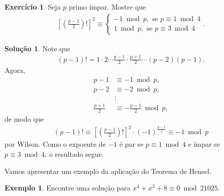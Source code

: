 \documentclass[a4paper,11pt,twoside, leqno]{article}
\theoremstyle{definition}
\newtheorem{exercise}{Exercício}
\newtheorem*{example}{Exemplo}
\newtheorem*{solution}{Solução}
\begin{document}
\begin{exercise}
	Seja $p$ primo ímpar. Mostre que
	\begin{align*}
	\left[ \left( \frac{p-1}{2} \right)! \right]^2\equiv\begin{cases}
	-1\bmod p, \text{ se } p\equiv 1\bmod 4 \\
	1\bmod p, \text{ se } p\equiv 3\bmod 4
	\end{cases}.
	\end{align*}
\end{exercise}
\begin{solution}
	Note que 
	\begin{align*}
	(p-1)! = 1\cdot 2\cdots \frac{p-1}{2}\cdot\frac{p+1}{2}\cdots (p-2)(p-1).
	\end{align*}
	Agora,
	\begin{align*}
	p-1&\equiv -1\bmod p, \\
	p-2&\equiv -2\bmod p, \\
	&\vdots \\
	\frac{p+1}{2}&\equiv -\frac{p-1}{2}\bmod p,
	\end{align*}
	de modo que 
	\begin{align*}
	(p-1)! \equiv \left[ \left( \frac{p-1}{2} \right)! \right]^2\cdot (-1)^{\frac{p-1}{2}} \equiv -1\bmod p
	\end{align*}
	por Wilson. Como o expoente de $-1$ é par se $p\equiv 1\bmod 4$ e ímpar se $p\equiv 3\bmod 4$, o resultado segue.
\end{solution}
Vamos apresentar um exemplo da aplicação do Teorema de Hensel.
\begin{example}
	Encontre uma solução para $x^4 + x^3 + 8\equiv 0\bmod 21025$.
\end{example}
\end{document}
